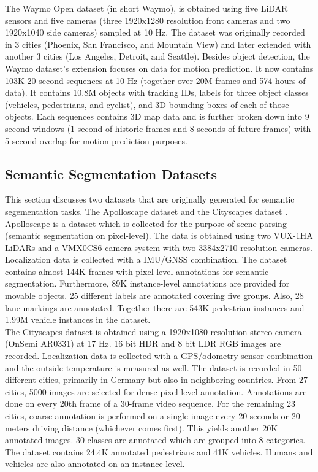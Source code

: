 The Waymo Open dataset \cite{sun2020scalability} (in short Waymo), is obtained using five LiDAR sensors and five cameras (three 1920x1280 resolution front cameras and two 1920x1040 side cameras) sampled at 10 Hz. The dataset was originally recorded in 3 cities (Phoenix, San Francisco, and Mountain View) and later extended with another 3 cities (Los Angeles, Detroit, and Seattle). Besides object detection, the Waymo dataset's extension focuses on data for motion prediction. It now contains 103K 20 second sequences at 10 Hz (together over 20M frames and 574 hours of data). It contains 10.8M objects with tracking IDs, labels for three object classes (vehicles, pedestrians, and cyclist), and 3D bounding boxes of each of those objects. Each sequences contains 3D map data and is further broken down into 9 second windows (1 second of historic frames and 8 seconds of future frames) with 5 second overlap for motion prediction purposes.  


\subsection{Semantic Segmentation Datasets}
This section discusses two datasets that are originally generated for semantic segementation tasks. The Apolloscape dataset \cite{huang2019apolloscape}  and the Cityscapes dataset \cite{cordts2016cityscapes}. \\

Apolloscape \cite{huang2019apolloscape} is a dataset which is collected for the purpose of scene parsing (semantic segmentation on pixel-level). The data is obtained using two VUX-1HA LiDARs and a VMX0CS6 camera system with two 3384x2710 resolution cameras. Localization data is collected with a IMU/GNSS combination. The dataset contains almost 144K frames with pixel-level annotations for semantic segmentation. Furthermore, 89K instance-level annotations are provided for movable objects. 25 different labels are annotated covering five groups. Also, 28 lane markings are annotated. Together there are 543K pedestrian instances and 1.99M vehicle instances in the dataset. \\

The Cityscapes dataset \cite{cordts2016cityscapes} is obtained using a 1920x1080 resolution stereo camera (OnSemi AR0331) at 17 Hz. 16 bit HDR and 8 bit LDR RGB images are recorded. Localization data is collected with a GPS/odometry sensor combination and the outside temperature is measured as well. The dataset is recorded in 50 different cities, primarily in Germany but also in neighboring countries. From 27 cities, 5000 images are selected for dense pixel-level annotation. Annotations are done on every 20th frame of a 30-frame video sequence. For the remaining 23 cities, coarse annotation is performed on a single image every 20 seconds or 20 meters driving distance (whichever comes first). This yields another 20K annotated images. 30 classes are annotated which are grouped into 8 categories. The dataset contains 24.4K annotated pedestrians and 41K vehicles. Humans and vehicles are also annotated on an instance level. 

